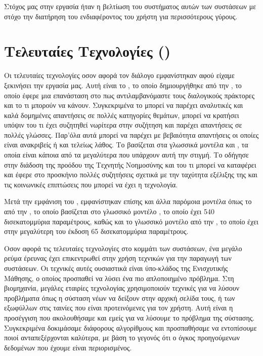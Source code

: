 Στόχος μας στην εργασία ήταν η βελτίωση του συστήματος αυτών των συστάσεων με στόχο την διατήρηση του ενδιαφέροντος του χρήστη για περισσότερους γύρους.

\section{Τελευταίες Τεχνολογίες ()}

Οι τελευταίες τεχνολογίες οσον αφορά τον διάλογο εμφανίστηκαν αφού είχαμε ξεκινήσει την εργασία μας. Αυτή είναι το , το οποίο δημιουργήθηκε από την , το οποίο έφερε μια επανάσταση στο πως αντιλαμβανόμαστε τους διαλογικούς πράκτορες και το τι μπορούν να κάνουν. Συγκεκριμένα το  μπορεί να παρέχει αναλυτικές και καλά δομημένες απαντήσεις σε πολλές κατηγορίες θεμάτων, μπορεί να κρατήσει υπόψιν του τι έχει συζητηθεί νωρίτερα στην συζήτηση και παρέχει απαντήσεις σε πολλές γλώσσες. Παρ'όλα αυτά μπορεί να παρέχει με βεβαιότητα απαντήσεις οι οποίες είναι ανακριβείς ή και τελείως λάθος. Το  βασίζεται στα γλωσσικά μοντέλα  και , τα οποία είναι κάποια από τα μεγαλύτερα που υπάρχουν αυτή την στιγμή. Το  οδήγησε στην διάδοση της προόδου της Τεχνητής Νοημοσύνης και του τι μπορεί να καταφέρει και έφερε στο προσκήνιο πολλές συζητήσεις σχετικά με την ταχύτητα εξέλιξης της και τις κοινωνικές επιπτώσεις που μπορεί να έχει η τεχνολογία.

Μετά την εμφάνιση του , εμφανίστηκαν επίσης και άλλα παρόμοια μοντέλα όπως το  από την , το οποίο βασίζεται στο γλωσσικό μοντέλο , το οποίο έχει 540 δισεκατομμύρια παραμέτρους, καθώς και το γλωσσικό μοντέλο  από την , το οποίο έχει στην μεγαλύτερη του έκδοση 65 δισεκατομμύρια παραμέτρους.

Οσον αφορά τις τελευταίες τεχνολογίες στο κομμάτι των συστάσεων, ένα μεγάλο ρεύμα έρευνας έχει επικεντρωθεί στην χρήση τεχνικών  για την παραγωγή των συστάσεων. Οι τεχνικές αυτές ουσιαστικά είναι ύπο-κλάδος της Ενισχυτικής Μάθησης, ο οποίος προσπαθεί να λύσει ένα πιο απλοποιημένο πρόβλημα. Στη βιομηχανία, μεγάλες εταιρίες τεχνολογίας χρησιμοποιούν τεχνικές  για να λύσουν προβλήματα όπως η σύσταση νέων να δείξουν στην αρχική σελίδα τους, ή των εξωφύλλων στις ταινίες που είναι προτεινόμενες για τον χρήστη. Αυτή είναι η προσέγγιση που ακολουθήσαμε και εμείς για να λύσουμε το πρόβλημα της σύστασης. Συγκεκριμένα δοκιμάσαμε διάφορους αλγορίθμους και προσπαθήσαμε να εντοπίσουμε ποιοί ανταπεξέρχονται καλύτερα, με βάση το γεγονός ότι ο όγκος προηγούμενων δεδομένων που έχουμε είναι περιορισμένος.

